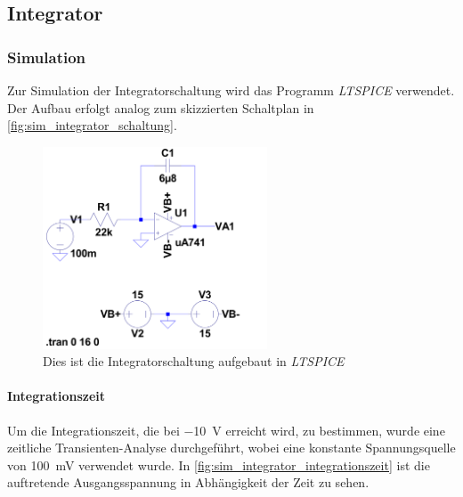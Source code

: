 \documentclass[12pt,english,ngerman]{scrartcl}
\begin{document}

\subsection{Integrator}

\subsubsection{Simulation}
Zur Simulation der Integratorschaltung wird das Programm
\textit{LTSPICE} verwendet. Der Aufbau erfolgt analog zum skizzierten
Schaltplan in \autoref{fig:sim_integrator_schaltung}. 

\begin{figure}[H]
  \centering
    \includegraphics[width=\textwidth, height=6cm,keepaspectratio]{./figures/integrator/sim/umkehr_int/schaltung.png}
  \caption{Dies ist die Integratorschaltung aufgebaut in \textit{LTSPICE}}
  \label{fig:sim_integrator_schaltung}
\end{figure}

\paragraph{Integrationszeit}
Um die Integrationszeit, die bei \SI{-10}{\volt} erreicht wird, zu bestimmen,
wurde eine zeitliche Transienten-Analyse durchgeführt, wobei eine konstante
Spannungsquelle von \SI{100}{\milli\volt} verwendet wurde. In
\autoref{fig:sim_integrator_integrationszeit} ist die auftretende
Ausgangsspannung in Abhängigkeit der Zeit zu sehen.
\end{document}

